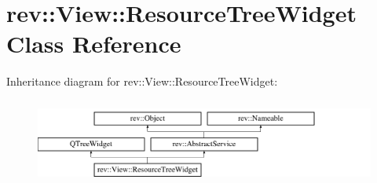 \hypertarget{classrev_1_1_view_1_1_resource_tree_widget}{}\section{rev\+::View\+::Resource\+Tree\+Widget Class Reference}
\label{classrev_1_1_view_1_1_resource_tree_widget}
Inheritance diagram for rev\+::View\+::Resource\+Tree\+Widget\+:\begin{figure}[H]
\begin{center}
\leavevmode
\includegraphics[height=2.842640cm]{classrev_1_1_view_1_1_resource_tree_widget}
\end{center}
\end{figure}
